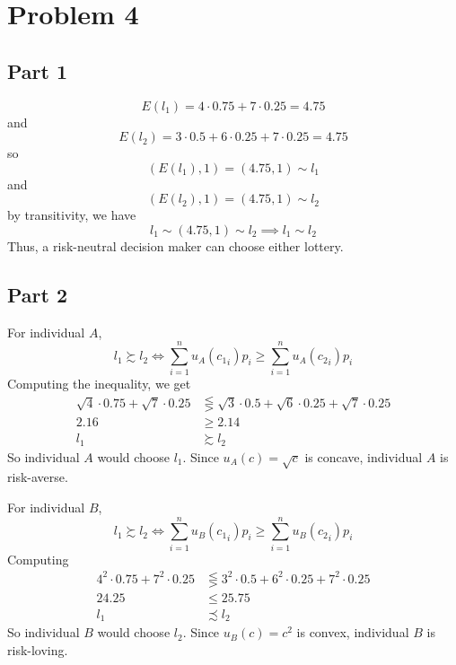 \documentclass[12pt]{extarticle}
\numberwithin{table}{section}
\numberwithin{figure}{section}
\numberwithin{equation}{section}
\begin{document}
\section*{Problem 4}

\subsection*{Part 1}
\begin{equation}
	E(l_1) = 4 \cdot 0.75 + 7 \cdot 0.25 = 4.75
\end{equation}
and
\begin{equation}
	E(l_2) = 3 \cdot 0.5 + 6 \cdot 0.25 + 7 \cdot 0.25 = 4.75
\end{equation}
so
\begin{equation}
	(E(l_1), 1) = (4.75, 1) \sim l_1
\end{equation}
and
\begin{equation}
	(E(l_2), 1) = (4.75, 1) \sim l_2
\end{equation}
by transitivity, we have
\begin{equation}
	l_1 \sim (4.75, 1) \sim l_2 \implies l_1 \sim l_2
\end{equation}
Thus, a risk-neutral decision maker can choose either lottery.

\subsection*{Part 2}
For individual $A$,
\begin{equation}
	l_1 \succsim l_2 \iff \sum_{i = 1}^n u_A({c_1}_i) p_i \ge \sum_{i = 1}^n u_A({c_2}_i) p_i
\end{equation}
Computing the inequality, we get
\begin{align}
	\sqrt{4} \cdot 0.75 + \sqrt7 \cdot 0.25 & \lesseqgtr \sqrt3 \cdot 0.5 + \sqrt6 \cdot 0.25 + \sqrt7 \cdot 0.25 \\
	2.16                                    & \ge 2.14                                                            \\
	l_1                                     & \succsim l_2
\end{align}
So individual $A$ would choose $l_1$. Since $u_A(c) = \sqrt c$ is concave, individual $A$ is risk-averse.

For individual $B$,
\begin{equation}
	l_1 \succsim l_2 \iff \sum_{i = 1}^n u_B({c_1}_i)p_i \ge \sum_{i = 1}^n u_B({c_2}_i) p_i
\end{equation}
Computing
\begin{align}
	4^2 \cdot 0.75 + 7^2 \cdot 0.25 & \lesseqgtr 3^2 \cdot 0.5 + 6^2 \cdot 0.25 + 7^2 \cdot 0.25 \\
	24.25                           & \le 25.75                                                  \\
	l_1                             & \precsim l_2
\end{align}
So individual $B$ would choose $l_2$. Since $u_B(c) = c^2$ is convex, individual $B$ is risk-loving.
\end{document}
